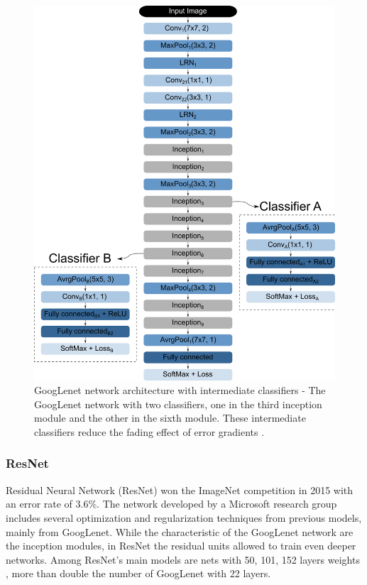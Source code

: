 \begin{figure}
    \centering
    \includegraphics[scale=0.4]{"Part 3 - Learning Systems/Supervised Learning/Deep Learning/images/figure134.png"}
    \caption{GoogLenet network architecture with intermediate classifiers - The GoogLenet network with two classifiers, one in the third inception module and the other in the sixth module. These intermediate classifiers reduce the fading effect of error gradients \cite{img:googlenet}.}
    \label{fig:googlenet2}
\end{figure}

\subsubsection{ResNet}
Residual Neural Network (ResNet) won the ImageNet competition in 2015 with an error rate of 3.6\%. The network developed by a Microsoft research group includes several optimization and regularization techniques from previous models, mainly from GoogLenet. While the characteristic of the GoogLenet network are the inception modules, in ResNet the residual units allowed to train even deeper networks. Among ResNet's main models are nets with 50, 101, 152 layers weights \cite{elgendy2020}, more than double the number of GoogLenet with 22 layers.

